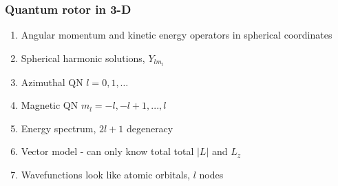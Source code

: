 \documentclass[11pt]{article}
\begin{document}
\subsubsection{Quantum rotor in 3-D}
\label{sec:org277c42a}
\begin{enumerate}
\item Angular momentum and kinetic energy operators in spherical coordinates
\item Spherical harmonic solutions, \(Y_{lm_l}\)
\item Azimuthal QN \(l=0, 1, \ldots\)
\item Magnetic QN \(m_l = -l, -l+1, ..., l\)
\item Energy spectrum, \(2 l + 1\) degeneracy
\item Vector model - can only know total total \(|L|\) and \(L_z\)
\item Wavefunctions look like atomic orbitals, \(l\) nodes
\end{enumerate}
\end{document}
